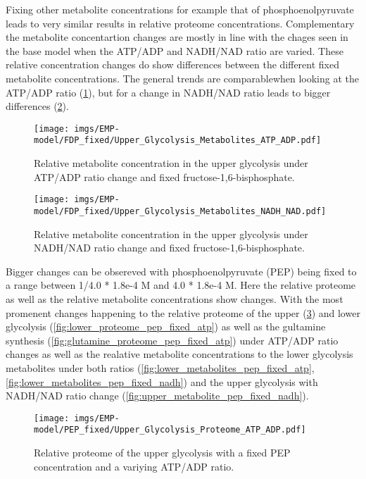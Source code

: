 Fixing other metabolite concentrations for example that of phosphoenolpyruvate leads to very similar results in relative proteome concentrations. Complementary the metabolite concentartion changes are mostly in line with the chages seen in the base model when the ATP/ADP and NADH/NAD ratio are varied. These relative concentration changes do show differences between the different fixed metabolite concentrations. The general trends are comparablewhen looking at the ATP/ADP ratio (\ref{fig:upper_metabolites_fdp_fixed_atp}), but for a change in NADH/NAD ratio leads to bigger differences (\ref{fig:upper_metabolites_fdp_fixed_nadh}). 
\begin{figure}[H]
    \centering
    \texttt{[image: imgs/EMP-model/FDP\_fixed/Upper\_Glycolysis\_Metabolites\_ATP\_ADP.pdf]}
    \caption{Relative metabolite concentration in the upper glycolysis under ATP/ADP ratio change and fixed fructose-1,6-bisphosphate.}
    \label{fig:upper_metabolites_fdp_fixed_atp}
\end{figure}

\begin{figure}[H]
    \centering
    \texttt{[image: imgs/EMP-model/FDP\_fixed/Upper\_Glycolysis\_Metabolites\_NADH\_NAD.pdf]}
    \caption{Relative metabolite concentration in the upper glycolysis under NADH/NAD ratio change and fixed fructose-1,6-bisphosphate.}
    \label{fig:upper_metabolites_fdp_fixed_nadh}
\end{figure}

Bigger changes can be obsereved with phosphoenolpyruvate (PEP) being fixed to a range between 1/4.0 * 1.8e-4 M and 4.0 * 1.8e-4 M. Here the relative proteome as well as the relative metabolite concentrations show changes. With the most promenent changes happening to the relative proteome of the upper (\ref{fig:upper_proteome_pep_fixed_atp}) and lower glycolysis (\ref{fig:lower_proteome_pep_fixed_atp}) as well as the gultamine synthesis (\ref{fig:glutamine_proteome_pep_fixed_atp}) under ATP/ADP ratio changes as well as the realative metabolite concentrations to the lower glycolysis metabolites under both ratios (\ref{fig:lower_metabolites_pep_fixed_atp}, \ref{fig:lower_metabolites_pep_fixed_nadh}) and the upper glycolysis with NADH/NAD ratio change (\ref{fig:upper_metabolite_pep_fixed_nadh}). 
\begin{figure}[H]
    \centering
    \texttt{[image: imgs/EMP-model/PEP\_fixed/Upper\_Glycolysis\_Proteome\_ATP\_ADP.pdf]}
    \caption{Relative proteome of the upper glycolysis with a fixed PEP concentration and a variying ATP/ADP ratio.}
    \label{fig:upper_proteome_pep_fixed_atp}
\end{figure}

